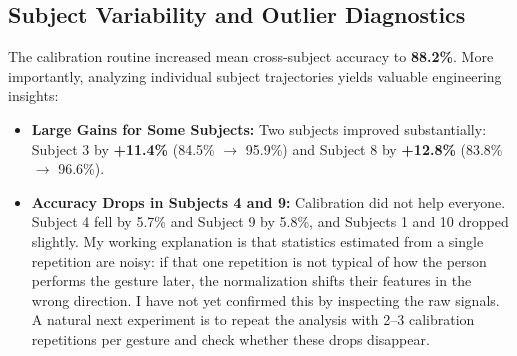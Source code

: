 \documentclass[11pt,a4paper]{article}
\begin{document}
\begin{table}[htbp]
\centering
\caption{Leave-One-Subject-Out (LOSO) Accuracy: Uncalibrated vs. Calibrated Pipeline}
\label{tab:loso_results}
\end{table}

\subsection{Subject Variability and Outlier Diagnostics}
The calibration routine increased mean cross-subject accuracy to \textbf{88.2\%}. More importantly, analyzing individual subject trajectories yields valuable engineering insights:
\begin{itemize}
    \item \textbf{Large Gains for Some Subjects:} Two subjects improved substantially: Subject 3 by \textbf{+11.4\%} (84.5\% $\to$ 95.9\%) and Subject 8 by \textbf{+12.8\%} (83.8\% $\to$ 96.6\%).
    \item \textbf{Accuracy Drops in Subjects 4 and 9:} Calibration did not help everyone. Subject 4 fell by 5.7\% and Subject 9 by 5.8\%, and Subjects 1 and 10 dropped slightly. My working explanation is that statistics estimated from a single repetition are noisy: if that one repetition is not typical of how the person performs the gesture later, the normalization shifts their features in the wrong direction. I have not yet confirmed this by inspecting the raw signals. A natural next experiment is to repeat the analysis with 2--3 calibration repetitions per gesture and check whether these drops disappear.
\end{itemize}
\end{document}
